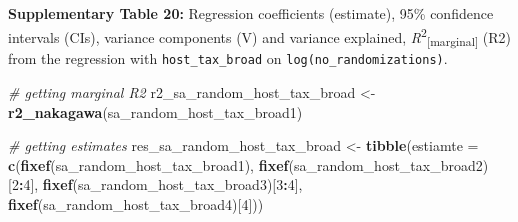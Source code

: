 \documentclass[
]{article}
\newenvironment{Shaded}{\begin{snugshade}}{\end{snugshade}}
\newcommand{\CommentTok}[1]{\textcolor[rgb]{0.56,0.35,0.01}{\textit{#1}}}
\newcommand{\DataTypeTok}[1]{\textcolor[rgb]{0.13,0.29,0.53}{#1}}
\newcommand{\DecValTok}[1]{\textcolor[rgb]{0.00,0.00,0.81}{#1}}
\newcommand{\KeywordTok}[1]{\textcolor[rgb]{0.13,0.29,0.53}{\textbf{#1}}}
\newcommand{\NormalTok}[1]{#1}
\newcommand{\OperatorTok}[1]{\textcolor[rgb]{0.81,0.36,0.00}{\textbf{#1}}}
\newcommand{\StringTok}[1]{\textcolor[rgb]{0.31,0.60,0.02}{#1}}
\begin{document}
\textbf{Supplementary Table 20:} Regression coefficients (estimate),
95\% confidence intervals (CIs), variance components (V) and variance
explained, \emph{R}\textsuperscript{2}\textsubscript{{[}marginal{]}}
(R2) from the regression with \texttt{host\_tax\_broad} on
\texttt{log(no\_randomizations)}.

\begin{Shaded}
\begin{Highlighting}[]
\CommentTok{# getting marginal R2}
\NormalTok{r2_sa_random_host_tax_broad <-}\StringTok{ }\KeywordTok{r2_nakagawa}\NormalTok{(sa_random_host_tax_broad1)}

\CommentTok{# getting estimates}
\NormalTok{res_sa_random_host_tax_broad <-}\StringTok{ }\KeywordTok{tibble}\NormalTok{(}\DataTypeTok{estiamte =} \KeywordTok{c}\NormalTok{(}\KeywordTok{fixef}\NormalTok{(sa_random_host_tax_broad1), }
                                                    \KeywordTok{fixef}\NormalTok{(sa_random_host_tax_broad2)[}\DecValTok{2}\OperatorTok{:}\DecValTok{4}\NormalTok{],}
                                                    \KeywordTok{fixef}\NormalTok{(sa_random_host_tax_broad3)[}\DecValTok{3}\OperatorTok{:}\DecValTok{4}\NormalTok{],}
                                                    \KeywordTok{fixef}\NormalTok{(sa_random_host_tax_broad4)[}\DecValTok{4}\NormalTok{])) }
  

\end{Highlighting}
\end{Shaded}
\end{document}

